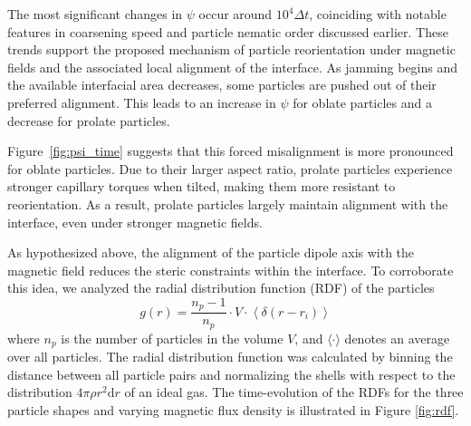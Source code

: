 The most significant changes in \(\psi\) occur around \(10^4 \Delta t\), coinciding with notable features in coarsening speed and particle nematic 
order discussed earlier. These trends support the proposed mechanism of particle reorientation under magnetic fields and the associated local 
alignment of the interface. As jamming begins and the available interfacial area decreases, some particles are pushed out of their preferred 
alignment. This leads to an increase in \(\psi\) for oblate particles and a decrease for prolate particles.

Figure~\ref{fig:psi_time} suggests that this forced misalignment is more pronounced for oblate particles. Due to their larger aspect ratio, prolate 
particles experience stronger capillary torques when tilted, making them more resistant to reorientation. As a result, prolate particles largely 
maintain alignment with the interface, even under stronger magnetic fields.

As hypothesized above, the alignment of the particle dipole axis with
the magnetic field reduces the steric constraints within the interface.
To corroborate this idea, we analyzed the radial distribution function
(RDF) of the particles
    \begin{equation}
        g(r) = \frac{n_p - 1}{n_p} \cdot V \cdot \left\langle \delta\left(r - r_i\right) \right\rangle
    \end{equation}
where \(n_p\) is the number of particles in the volume
\(V\), and \(\langle\cdot\rangle\) denotes an average over all
particles. The radial distribution function was calculated by binning
the distance between all particle pairs and normalizing the shells with
respect to the distribution \(4\pi \rho r^2 \mathrm{d}r\) of an ideal
gas. The time-evolution of the RDFs for the three particle shapes and
varying magnetic flux density is illustrated in Figure \ref{fig:rdf}.
    

